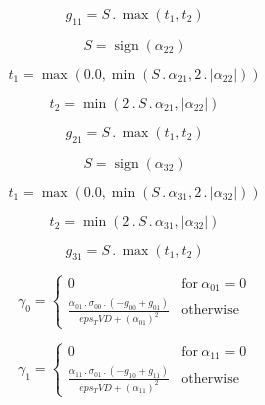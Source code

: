 \documentclass{article}
\begin{document}
\begin{dmath}g_{11} = S \,.\, \max\left(t_{1}, t_{2}\right)\end{dmath}

\begin{dmath}S = \operatorname{sign}{\left (\alpha_{22} \right )}\end{dmath}

\begin{dmath}t_{1} = \max\left(0.0, \min\left(S \,.\, \alpha_{21}, 2 \,.\, \left|{\alpha_{22}}\right|\right)\right)\end{dmath}

\begin{dmath}t_{2} = \min\left(2 \,.\, S \,.\, \alpha_{21}, \left|{\alpha_{22}}\right|\right)\end{dmath}

\begin{dmath}g_{21} = S \,.\, \max\left(t_{1}, t_{2}\right)\end{dmath}

\begin{dmath}S = \operatorname{sign}{\left (\alpha_{32} \right )}\end{dmath}

\begin{dmath}t_{1} = \max\left(0.0, \min\left(S \,.\, \alpha_{31}, 2 \,.\, \left|{\alpha_{32}}\right|\right)\right)\end{dmath}

\begin{dmath}t_{2} = \min\left(2 \,.\, S \,.\, \alpha_{31}, \left|{\alpha_{32}}\right|\right)\end{dmath}

\begin{dmath}g_{31} = S \,.\, \max\left(t_{1}, t_{2}\right)\end{dmath}

\begin{dmath}\gamma_{0} = \begin{cases} 0 & \text{for}\: \alpha_{01} = 0 \\\frac{\alpha_{01} \,.\, \sigma_{0 0} \,.\, \left(- g_{00} + g_{01}\right)}{eps_TVD + \left(\alpha_{01} \right)^{2}} & \text{otherwise} \end{cases}\end{dmath}

\begin{dmath}\gamma_{1} = \begin{cases} 0 & \text{for}\: \alpha_{11} = 0 \\\frac{\alpha_{11} \,.\, \sigma_{0 1} \,.\, \left(- g_{10} + g_{11}\right)}{eps_TVD + \left(\alpha_{11} \right)^{2}} & \text{otherwise} \end{cases}\end{dmath}
\end{document}
